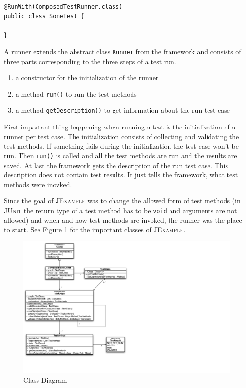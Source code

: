 \documentclass[11pt,a4paper,pdftex]{article}
\newcommand{\JUnit}{\textsc{JUnit}\xspace}
\newcommand{\JExample}{\textsc{JExample}\xspace}
\newcommand{\ttt}[1]{\texttt{#1}}
\begin{document}
\begin{lstlisting}[caption=test class definition in \JExample]

@RunWith(ComposedTestRunner.class)
public class SomeTest {

}

\end{lstlisting}

A runner extends the abstract class \ttt{Runner} from the framework and consists of three parts corresponding to the three steps of a test run.

\begin{enumerate}
 \item a constructor for the initialization of the runner
 \item a method \ttt{run()} to run the test methods
 \item a method \ttt{getDescription()} to get information about the run test case
\end{enumerate}
First important thing happening when running a test is the initialization of a runner per test case. The initialization consists of collecting and validating the test methods. If something fails during the initialization the test case won't be run. Then \ttt{run()} is called and all the test methods are run and the results are saved. At last the framework gets the description of the run test case. This description does not contain test results. It just tells the framework, what test methods were inovked.

Since the goal of \JExample was to change the allowed form of test methods (in \JUnit the return type of a test method has to be \ttt{void} and arguments are not allowed) and when and how test methods are invoked, the runner was the place to start.
See Figure \ref{fig:classDiag} for the important classes of \JExample.

\begin{figure}[htbp]
 \includegraphics[width=24.0cm]{classdiagram.pdf}
 \caption{Class Diagram}
 \label{fig:classDiag}
\end{figure}
\end{document}
